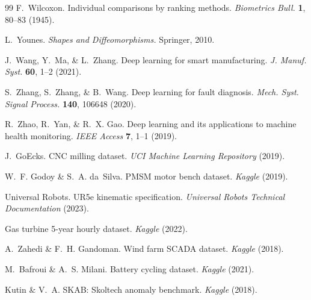 \documentclass[11pt]{article}
\begin{document}
\begin{thebibliography}{99}
F.~Wilcoxon.
Individual comparisons by ranking methods.
\emph{Biometrics Bull.} \textbf{1}, 80--83 (1945).

L.~Younes.
\emph{Shapes and Diffeomorphisms.}
Springer, 2010.

J.~Wang, Y.~Ma, \& L.~Zhang.
Deep learning for smart manufacturing.
\emph{J. Manuf. Syst.} \textbf{60}, 1--2 (2021).

S.~Zhang, S.~Zhang, \& B.~Wang.
Deep learning for fault diagnosis.
\emph{Mech. Syst. Signal Process.} \textbf{140}, 106648 (2020).

R.~Zhao, R.~Yan, \& R.~X. Gao.
Deep learning and its applications to machine health monitoring.
\emph{IEEE Access} \textbf{7}, 1--1 (2019).

J.~GoEcks.
CNC milling dataset.
\emph{UCI Machine Learning Repository} (2019).

W.~F. Godoy \& S.~A. da~Silva.
PMSM motor bench dataset.
\emph{Kaggle} (2019).

Universal Robots.
UR5e kinematic specification.
\emph{Universal Robots Technical Documentation} (2023).

Gas turbine 5-year hourly dataset.
\emph{Kaggle} (2022).

A.~Zahedi \& F.~H. Gandoman.
Wind farm SCADA dataset.
\emph{Kaggle} (2018).

M.~Bafroui \& A.~S. Milani.
Battery cycling dataset.
\emph{Kaggle} (2021).

Kutin \& V.~A.
SKAB: Skoltech anomaly benchmark.
\emph{Kaggle} (2018).

\end{thebibliography}
\end{document}
